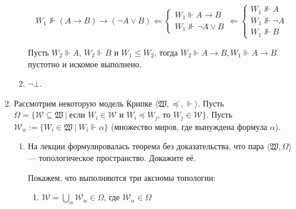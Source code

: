 \begin{enumerate}[wide, labelwidth=!, labelindent=0pt]
\begin{enumerate}[wide, labelwidth=!, labelindent=0pt]
                    \[W_1 \nVdash (A \rightarrow B) \rightarrow (\neg A \vee B) \Leftarrow \begin{cases}
                            W_1 \Vdash A \to B \\
                            W_1 \nVdash \neg A \lor B
                        \end{cases} \Leftarrow \begin{cases}
                            W_1 \nVdash A      \\
                            W_1 \nVdash \neg A \\
                            W_1 \nVdash B
                        \end{cases}\]

                    Пусть \(W_2 \Vdash A\), \(W_2 \Vdash B\) и \(W_1 \leq W_2\), тогда \(W_2 \Vdash A \to B, W_1 \Vdash A \to B\) пустотно и искомое выполнено.

              \item $\neg\bot$.

                    \begin{prooftree}
                    \end{prooftree}
          \end{enumerate}

    \item Рассмотрим некоторую модель Крипке $\langle\mathfrak{W},\preceq,\Vdash\rangle$.
          Пусть $\Omega = \{ \mathcal{W} \subseteq \mathfrak{W}\ |\ \text{если }W_i \in \mathcal{W}\text{ и }W_i \preceq W_j\text{, то } W_j \in \mathcal{W}\}$.
          Пусть $\mathcal{W}_\alpha := \{ W_i \in \mathfrak{W}\ |\ W_i \Vdash \alpha \}$ (множество миров, где вынуждена формула $\alpha$).
          \begin{enumerate}
              \item На лекции формулировалась теорема без доказательства, что пара $\langle\mathfrak{W}, \Omega\rangle$ --- топологическое пространство. Докажите её.

                    Покажем, что выполняются три аксиомы топологии:
                    \begin{enumerate}
                        \item \(\mathcal{W} = \bigcup_\alpha \mathcal{W}_\alpha \in \Omega\), где \(\mathcal{W}_\alpha\in\Omega\)


\end{enumerate}
\end{enumerate}
\end{enumerate}
